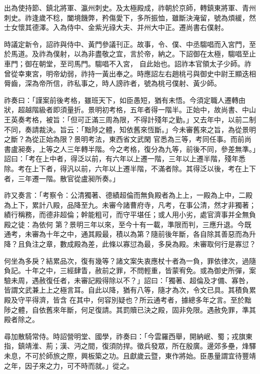 \begin{pinyinscope}
 出為使持節、鎮北將軍、瀛州刺史。及太極殿成，祚朝於京師，轉鎮東將軍、青州刺史。祚逢歲不稔，闔境饑弊，矜傷愛下，多所振恤，雖斷決淹留，號為煩緩，然士女懷其德澤。入為侍中、金紫光祿大夫、并州大中正。遷尚書右僕射。



 時議定新令，詔祚與侍中、黃門參議刊正。故事，令、僕、中丞騶唱而入宮門，至於馬道。及祚為僕射，以為非盡敬之宜，言於帝，納之。下詔御在太極，騶唱至止車門；御在朝堂，至司馬門。騶唱不入宮，
 自此始也。詔祚本官領太子少師。祚曾從幸東宮，明帝幼弱，祚持一黃出奉之。時應詔左右趙桃弓與御史中尉王顯迭相脣齒，深為帝所信，祚私事之，時人謗祚者，號為桃弓僕射、黃少師。



 祚奏曰：「謹案前後考格，雖班天下，如臣愚短，猶有未悟。今須定職人遷轉由狀，超越階級者即須量折。景明初考格，五年者得一階半。正始中，故尚書、中山王英奏考格，被旨：「但可正滿三周為限，不得計殘年之勤。」又去年中，以前二制不同，奏請裁決。旨云：「黜陟之體，知依舊來恆斷。」今未審舊來之旨，為從景明之斷？為從正始為限？景明考法，東西省文武閑
 官悉為三等，考同任事。而前尚書盧昶奏，上等之人三年轉半階。今之考格，復分為九等，前後不同，參差無準。」詔曰：「考在上中者，得泛以前，有六年以上遷一階，三年以上遷半階，殘年悉除。考在上下者，得汎以前，六年以上遷半階，不滿者除。其得泛以後，考在上下者，三年遷一階。散官從盧昶所奏。」



 祚又奏言：「考察令：公清獨著、德績超倫而無負殿者為上上，一殿為上中，二殿為上下，累計八殿，品降至九。未審今諸曹府寺，凡考，在事公清，然才非獨著；績行稱務，而德非超倫；幹能粗可，而守平堪任；或人用小劣，處官濟事并全無負殿之徒：為依何
 第？景明三年以來，至今十有一載，準限而判，三應升退。今既通考，未審為十年之中，通其殿最，積以為第？隨前後年斷，各自除其善惡而為升降？且負注之章，數成殿為差，此條以寡愆為最，多戾為殿。未審取何行是寡愆？



 何坐為多戾？結累品次，復有幾等？諸文案失衷應杖十者為一負，罪依律次，過隨負記。十年之中，三經肆眚，赦前之罪，不問輕重，皆蒙宥免。或為御史所彈，案驗未周，遇赦復任者，未審記殿得除以不？」詔曰：「獨著、超倫及才備、寡咎，皆謂文武兼上上之極言耳。自此以降，猶有八等，隨才為次，令文已具。其積負累殿及守平得濟，皆含
 在其中，何容別疑也？所云通考者，據總多年之言。至於黜陟之體，自依舊來年斷，何足復請。其罰贖已決之殿，固非免限。遇赦免罪，準其殿者除之。



 尋加散騎常侍。時詔營明堂、國學，祚奏曰：「今雲羅西舉，開納岷、蜀；戎旗東指，鎮靖淮、荊；漢、沔之間，復須防捍。徵兵發眾，所在殷廣。邊郊多壘，烽驛未息，不可於師旅之際，興板築之功。且獻歲云暨，東作將始。臣愚量謂宜待豐靖之年，因子來之力，可不時而就。」從之。




\end{pinyinscope}
